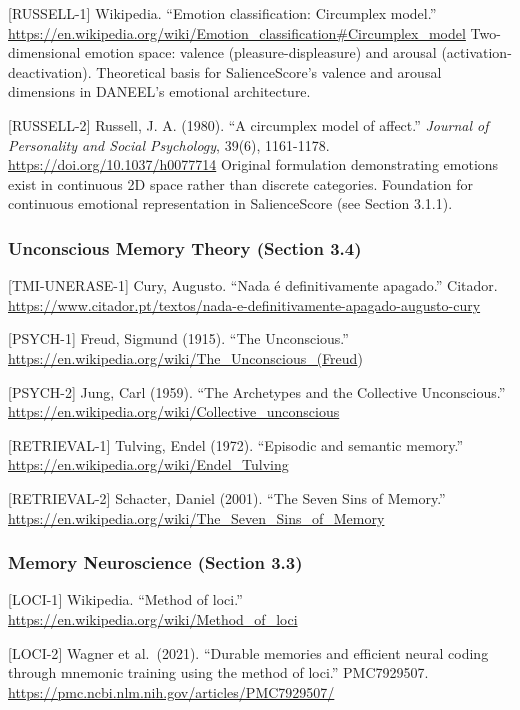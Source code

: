 \documentclass[
  11pt,
]{article}
\begin{document}
{[}RUSSELL-1{]} Wikipedia. ``Emotion classification: Circumplex model.''
\url{https://en.wikipedia.org/wiki/Emotion_classification#Circumplex_model}
Two-dimensional emotion space: valence (pleasure-displeasure) and
arousal (activation-deactivation). Theoretical basis for SalienceScore's
valence and arousal dimensions in DANEEL's emotional architecture.

{[}RUSSELL-2{]} Russell, J. A. (1980). ``A circumplex model of affect.''
\emph{Journal of Personality and Social Psychology}, 39(6), 1161-1178.
\url{https://doi.org/10.1037/h0077714} Original formulation
demonstrating emotions exist in continuous 2D space rather than discrete
categories. Foundation for continuous emotional representation in
SalienceScore (see Section 3.1.1).

\subsubsection{Unconscious Memory Theory (Section
3.4)}\label{unconscious-memory-theory-section-3.4}

{[}TMI-UNERASE-1{]} Cury, Augusto. ``Nada é definitivamente apagado.''
Citador.
\url{https://www.citador.pt/textos/nada-e-definitivamente-apagado-augusto-cury}

{[}PSYCH-1{]} Freud, Sigmund (1915). ``The Unconscious.''
\url{https://en.wikipedia.org/wiki/The_Unconscious_(Freud})

{[}PSYCH-2{]} Jung, Carl (1959). ``The Archetypes and the Collective
Unconscious.''
\url{https://en.wikipedia.org/wiki/Collective_unconscious}

{[}RETRIEVAL-1{]} Tulving, Endel (1972). ``Episodic and semantic
memory.'' \url{https://en.wikipedia.org/wiki/Endel_Tulving}

{[}RETRIEVAL-2{]} Schacter, Daniel (2001). ``The Seven Sins of Memory.''
\url{https://en.wikipedia.org/wiki/The_Seven_Sins_of_Memory}

\subsubsection{Memory Neuroscience (Section
3.3)}\label{memory-neuroscience-section-3.3}

{[}LOCI-1{]} Wikipedia. ``Method of loci.''
\url{https://en.wikipedia.org/wiki/Method_of_loci}

{[}LOCI-2{]} Wagner et al.~(2021). ``Durable memories and efficient
neural coding through mnemonic training using the method of loci.''
PMC7929507. \url{https://pmc.ncbi.nlm.nih.gov/articles/PMC7929507/}
\end{document}
